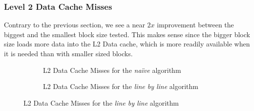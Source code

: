 \documentclass[11pt,a4paper]{article}
\begin{document}
\subsubsection{Level 2 Data Cache Misses}

Contrary to the previous section, we see a near $2x$ improvement between the biggest and the smallest block size tested. This makes sense since the bigger block size loads more data into the L2 Data cache, which is more readily available when it is needed than with smaller sized blocks.

\begin{figure}[H]
    \centering
    \begin{subfigure}{0.48\textwidth}
        \centering
        \caption{L2 Data Cache Misses for the \emph{naïve} algorithm}
    \end{subfigure}
    \hfill%
    \begin{subfigure}{0.48\textwidth}
        \centering
        \caption{L2 Data Cache Misses for the \emph{line by line} algorithm}
    \end{subfigure}
\end{figure}
\end{document}
